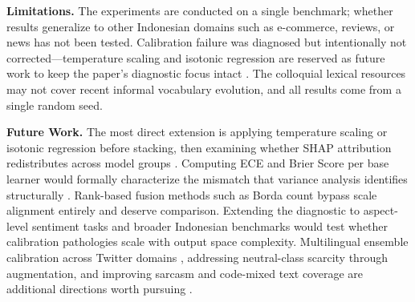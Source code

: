 \documentclass[conference]{IEEEtran}
\begin{document}
\textbf{Limitations.} The experiments are conducted on a single benchmark; whether results generalize to other Indonesian domains such as e-commerce, reviews, or news has not been tested. Calibration failure was diagnosed but intentionally not corrected---temperature scaling and isotonic regression are reserved as future work to keep the paper's diagnostic focus intact \cite{b15}. The colloquial lexical resources \cite{b14} may not cover recent informal vocabulary evolution, and all results come from a single random seed.

\textbf{Future Work.} The most direct extension is applying temperature scaling or isotonic regression before stacking, then examining whether SHAP attribution redistributes across model groups \cite{b15}. Computing ECE and Brier Score per base learner would formally characterize the mismatch that variance analysis identifies structurally \cite{b23}. Rank-based fusion methods such as Borda count bypass scale alignment entirely and deserve comparison. Extending the diagnostic to aspect-level sentiment tasks \cite{b24} and broader Indonesian benchmarks \cite{b19} would test whether calibration pathologies scale with output space complexity. Multilingual ensemble calibration across Twitter domains \cite{b29}, addressing neutral-class scarcity through augmentation, and improving sarcasm and code-mixed text coverage \cite{b26} are additional directions worth pursuing \cite{b21}.
\end{document}
